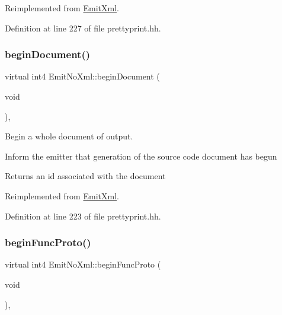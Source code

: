 Reimplemented from \mbox{\hyperlink{class_emit_xml_ad6cc09d4dfde00428eae8d556cd0fe72}{Emit\+Xml}}.



Definition at line 227 of file prettyprint.\+hh.

\mbox{\label{class_emit_no_xml_ac2cedec116ad98013fe4d7c00b230793}} 
\subsubsection{\texorpdfstring{beginDocument()}{beginDocument()}}
{\footnotesize\ttfamily virtual int4 Emit\+No\+Xml\+::begin\+Document (\begin{DoxyParamCaption}\item[{void}]{ }\end{DoxyParamCaption})\hspace{0.3cm}{\ttfamily [inline]}, {\ttfamily [virtual]}}



Begin a whole document of output. 

Inform the emitter that generation of the source code document has begun \begin{DoxyReturn}{Returns}
an id associated with the document 
\end{DoxyReturn}


Reimplemented from \mbox{\hyperlink{class_emit_xml_a9a4891144e0743f2b10faa32e6d34181}{Emit\+Xml}}.



Definition at line 223 of file prettyprint.\+hh.

\mbox{\label{class_emit_no_xml_a3ae360f835420fdb0972a9d883012252}} 
\subsubsection{\texorpdfstring{beginFuncProto()}{beginFuncProto()}}
{\footnotesize\ttfamily virtual int4 Emit\+No\+Xml\+::begin\+Func\+Proto (\begin{DoxyParamCaption}\item[{void}]{ }\end{DoxyParamCaption})\hspace{0.3cm}{\ttfamily [inline]}, {\ttfamily [virtual]}}



